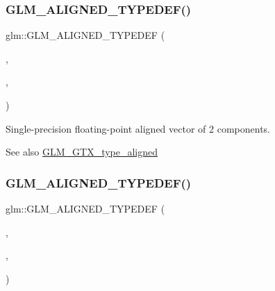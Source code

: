 \subsubsection{\texorpdfstring{G\+L\+M\+\_\+\+A\+L\+I\+G\+N\+E\+D\+\_\+\+T\+Y\+P\+E\+D\+E\+F()}{GLM\_ALIGNED\_TYPEDEF()}\hspace{0.1cm}{\footnotesize\ttfamily [148/209]}}
{\footnotesize\ttfamily glm\+::\+G\+L\+M\+\_\+\+A\+L\+I\+G\+N\+E\+D\+\_\+\+T\+Y\+P\+E\+D\+EF (\begin{DoxyParamCaption}\item[{\hyperlink{group__gtc__type__precision_ga83fb34639f810d0c9240cf7ff0180e20}{fvec2}}]{,  }\item[{aligned\+\_\+fvec2}]{,  }\item[{8}]{ }\end{DoxyParamCaption})}

Single-\/precision floating-\/point aligned vector of 2 components. \begin{DoxySeeAlso}{See also}
\hyperlink{group__gtx__type__aligned}{G\+L\+M\+\_\+\+G\+T\+X\+\_\+type\+\_\+aligned} 
\end{DoxySeeAlso}
\mbox{\label{group__gtx__type__aligned_ga009afd727fd657ef33a18754d6d28f60}} 
\subsubsection{\texorpdfstring{G\+L\+M\+\_\+\+A\+L\+I\+G\+N\+E\+D\+\_\+\+T\+Y\+P\+E\+D\+E\+F()}{GLM\_ALIGNED\_TYPEDEF()}\hspace{0.1cm}{\footnotesize\ttfamily [149/209]}}
{\footnotesize\ttfamily glm\+::\+G\+L\+M\+\_\+\+A\+L\+I\+G\+N\+E\+D\+\_\+\+T\+Y\+P\+E\+D\+EF (\begin{DoxyParamCaption}\item[{\hyperlink{group__gtc__type__precision_ga8480fdaa7fb8e177e57b367be79863d8}{fvec3}}]{,  }\item[{aligned\+\_\+fvec3}]{,  }\item[{16}]{ }\end{DoxyParamCaption})}

